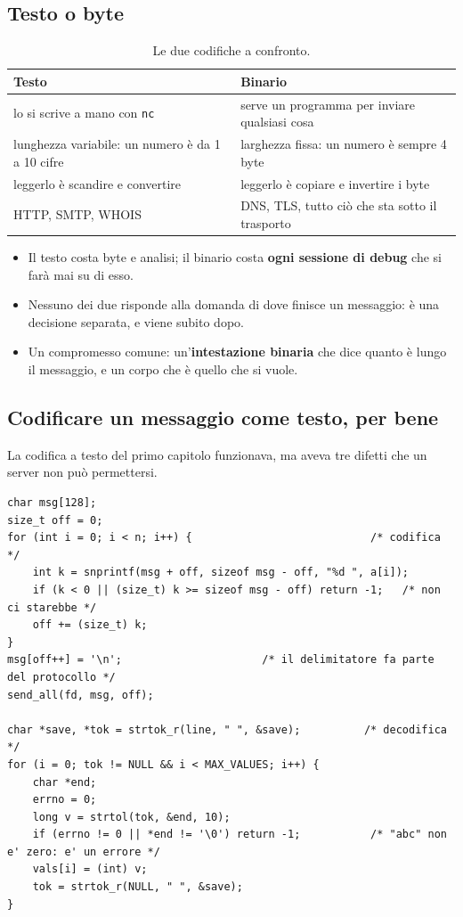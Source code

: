 \subsection{Testo o byte}

\begin{table}[H]
\centering
\begin{tabular}{l l}
\toprule
\textbf{Testo} & \textbf{Binario} \\
\midrule
lo si scrive a mano con \texttt{nc}              & serve un programma per inviare qualsiasi cosa \\
lunghezza variabile: un numero è da 1 a 10 cifre & larghezza fissa: un numero è sempre 4 byte \\
leggerlo è scandire e convertire                 & leggerlo è copiare e invertire i byte \\
HTTP, SMTP, WHOIS                                & DNS, TLS, tutto ciò che sta sotto il trasporto \\
\bottomrule
\end{tabular}
\caption{Le due codifiche a confronto.}
\end{table}

\begin{itemize}
    \item Il testo costa byte e analisi; il binario costa \textbf{ogni sessione di debug} che si farà mai su di esso.
    \item Nessuno dei due risponde alla domanda di dove finisce un messaggio: è una decisione separata, e viene subito dopo.
    \item Un compromesso comune: un'\textbf{intestazione binaria} che dice quanto è lungo il messaggio, e un corpo che è
          quello che si vuole.
\end{itemize}

\subsection{Codificare un messaggio come testo, per bene}

La codifica a testo del primo capitolo funzionava, ma aveva tre difetti che un server non può permettersi.

\begin{lstlisting}[language={[POSIX]C}, style=wnumbers, title={Codificare e decodificare una riga di numeri}]
char msg[128];
size_t off = 0;
for (int i = 0; i < n; i++) {                            /* codifica */
    int k = snprintf(msg + off, sizeof msg - off, "%d ", a[i]);
    if (k < 0 || (size_t) k >= sizeof msg - off) return -1;   /* non ci starebbe */
    off += (size_t) k;
}
msg[off++] = '\n';                      /* il delimitatore fa parte del protocollo */
send_all(fd, msg, off);

char *save, *tok = strtok_r(line, " ", &save);          /* decodifica */
for (i = 0; tok != NULL && i < MAX_VALUES; i++) {
    char *end;
    errno = 0;
    long v = strtol(tok, &end, 10);
    if (errno != 0 || *end != '\0') return -1;           /* "abc" non e' zero: e' un errore */
    vals[i] = (int) v;
    tok = strtok_r(NULL, " ", &save);
}
\end{lstlisting}

